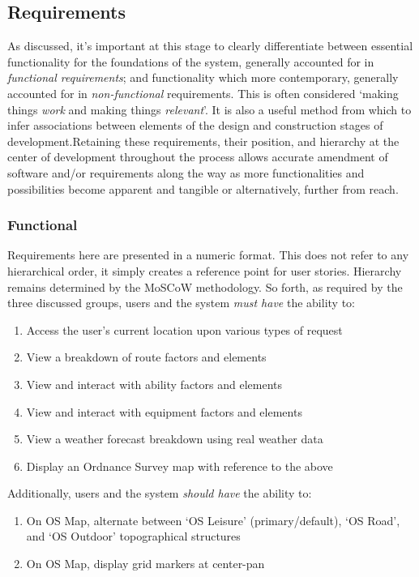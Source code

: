 \documentclass[11pt, english]{article}
\begin{document}
	\subsection{Requirements}

	As discussed, it's important at this stage to clearly differentiate between essential functionality for the foundations of the system, generally accounted for in \textit{functional requirements}; and functionality which more contemporary, generally accounted for in \textit{non-functional} requirements. This is often considered `making things \textit{work} and making things \textit{relevant}'. It is also a useful method from which to infer associations between elements of the design and construction stages of development.Retaining these requirements, their position, and hierarchy at the center of development throughout the process allows accurate amendment of software and/or requirements along the way as more functionalities and possibilities become apparent and tangible or alternatively, further from reach.

		\subsubsection{Functional}

	Requirements here are presented in a numeric format. This does not refer to any hierarchical order, it simply creates a reference point for user stories. Hierarchy remains determined by the MoSCoW methodology. So forth, as required by the three discussed groups, users and the system \textit{must have} the ability to:

	\begin{enumerate}
	\setlength\itemsep{0cm}
		\item Access the user's current location upon various types of request
		\item View a breakdown of route factors and elements
		\item View and interact with ability factors and elements
		\item View and interact with equipment factors and elements
		\item View a weather forecast breakdown using real weather data
		\item Display an Ordnance Survey map with reference to the above
	\end{enumerate}

	Additionally, users and the system \textit{should have} the ability to:

	\begin{enumerate}
	\setlength\itemsep{0cm}
		\item On OS Map, alternate between `OS Leisure' (primary/default), `OS Road', and `OS Outdoor' topographical structures
		\item On OS Map, display grid markers at center-pan
	\end{enumerate}
\end{document}
